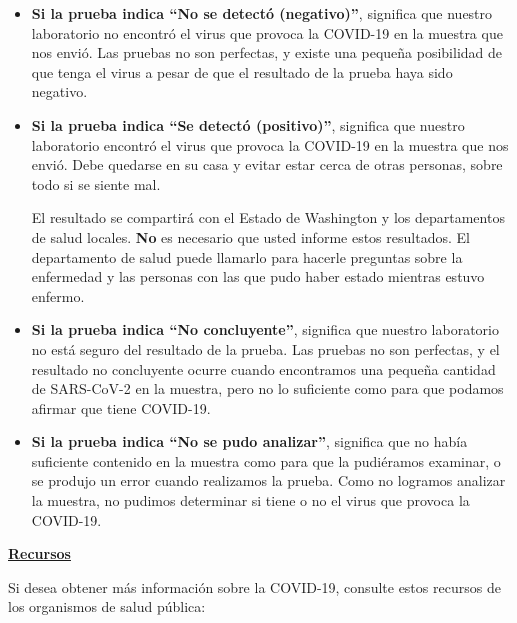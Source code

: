 \documentclass[10pt]{article}
\begin{document}
\begin{itemize}


\item

  \textbf{Si la prueba indica ``No se detectó (negativo)''}, significa que nuestro
  laboratorio no encontró el virus que provoca la COVID-19 en la muestra que nos
  envió. Las pruebas no son perfectas, y existe una pequeña posibilidad de que
  tenga el virus a pesar de que el resultado de la prueba haya sido negativo.


\item

  \textbf{Si la prueba indica ``Se detectó (positivo)''}, significa que nuestro
  laboratorio encontró el virus que provoca la COVID-19 en la muestra que nos
  envió. Debe quedarse en su casa y evitar estar cerca de otras personas, sobre
  todo si se siente mal.

  El resultado se compartirá con el Estado de Washington y los departamentos de
  salud locales. \textbf{No} es necesario que usted informe estos resultados. El
  departamento de salud puede llamarlo para hacerle preguntas sobre la
  enfermedad y las personas con las que pudo haber estado mientras estuvo
  enfermo.


\item

  \textbf{Si la prueba indica ``No concluyente''}, significa que nuestro
  laboratorio no está seguro del resultado de la prueba. Las pruebas no son
  perfectas, y el resultado no concluyente ocurre cuando encontramos una pequeña
  cantidad de SARS-CoV-2 en la muestra, pero no lo suficiente como para que
  podamos afirmar que tiene COVID-19.


\item

  \textbf{Si la prueba indica ``No se pudo analizar''}, significa que no había
  suficiente contenido en la muestra como para que la pudiéramos examinar, o se
  produjo un error cuando realizamos la prueba. Como no logramos analizar la
  muestra, no pudimos determinar si tiene o no el virus que provoca la COVID-19.


\end{itemize}

\bigskip

\large \underline{\textbf{Recursos}}

Si desea obtener más información sobre la COVID-19, consulte estos recursos de
los organismos de salud pública:
\end{document}
